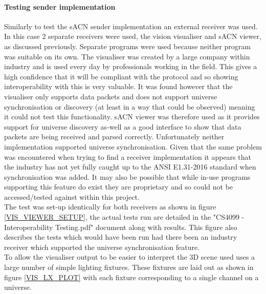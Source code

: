 \documentclass[11pt,a4paper]{article}
\begin{document}
\paragraph*{Testing sender implementation}
Similarly to test the sACN sender implementation an external receiver was used. In this case 2 separate receivers were used, the vision visualiser and sACN viewer, as discussed previously. Separate programs were used because neither program was suitable on its own. The visualiser was created by a large company within industry and is used every day by professionals working in the field. This gives a high confidence that it will be compliant with the protocol and so showing interoperability with this is very valuable. It was found however that the visualiser only supports data packets and does not support universe synchronisation or discovery (at least in a way that could be observed) meaning it could not test this functionality. sACN viewer was therefore used as it provides support for universe discovery as-well as a good interface to show that data packets are being received and parsed correctly. Unfortunately neither implementation supported universe synchronisation. Given that the same problem was encountered when trying to find a receiver implementation it appears that the industry has not yet fully caught up to the ANSI E1.31-2016 standard when synchronisation was added. It may also be possible that while in-use programs supporting this feature do exist they are proprietary and so could not be accessed/tested against within this project. \\

The test was set-up identically for both receivers as shown in figure \ref{VIS_VIEWER_SETUP}, the actual tests run are detailed in the "CS4099 - Interoperability Testing.pdf" document along with results. This figure also describes the tests which would have been run had there been an industry receiver which supported the universe synchronisation feature.\\

To allow the visualiser output to be easier to interpret the 3D scene used uses a large number of simple lighting fixtures. These fixtures are laid out as shown in figure \ref{VIS_LX_PLOT} with each fixture corresponding to a single channel on a universe.\\
\end{document}
